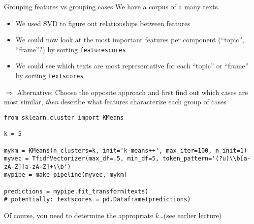 \begin{frame}{Grouping features vs grouping cases}
  We have a  corpus of a many texts.
  
\begin{itemize}
\item We used SVD to figure out relationships between features
\item We could now look at the most important features per component (``topic'', ``frame''?) by sorting \texttt{featurescores}
\item We could see which texts are most representative for each ``topic'' or ``frame'' by sorting \texttt{textscores}
\end{itemize}
\pause

$\Rightarrow$ Alternative: Choose the opposite approach and first find out which cases are most similar, \textit{then} describe what features characterize each group of cases


\end{frame}





\begin{frame}
\begin{verbatim}
from sklearn.cluster import KMeans

k = 5

mykm = KMeans(n_clusters=k, init='k-means++', max_iter=100, n_init=1)
myvec = TfidfVectorizer(max_df=.5, min_df=5, token_pattern='(?u)\\b[a-zA-Z][a-zA-Z]+\\b')
mypipe = make_pipeline(myvec, mykm)

predictions = mypipe.fit_transform(texts)
# potentially: textscores = pd.Dataframe(predictions)
\end{verbatim}

Of course, you need to determine the appropriate $k$\ldots (see earlier lecture)



\end{frame}


